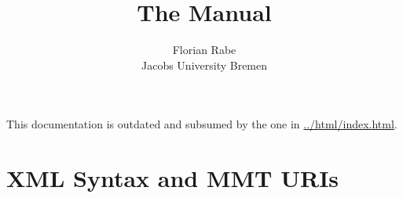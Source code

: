 \documentclass{article}
\title{The {\mmt} Manual}
\author{Florian Rabe \\
Jacobs University Bremen}
\begin{document}
\maketitle

\begin{center}
This documentation is outdated and subsumed by the one in \url{../html/index.html}.
\end{center}

\section{XML Syntax and MMT URIs}\label{sec:syntax}
  




\end{document}
